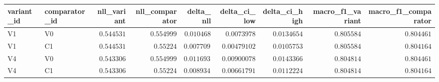 \begin{tabular}{llrrrrrrr}
\toprule
variant\_id & comparator\_id & nll\_variant & nll\_comparator & delta\_nll & delta\_ci\_low & delta\_ci\_high & macro\_f1\_variant & macro\_f1\_comparator \\
\midrule
V1 & V0 & $0.544531$ & $0.554999$ & $0.010468$ & $0.0073978$ & $0.0134654$ & $0.805584$ & $0.804461$ \\
V1 & C1 & $0.544531$ & $0.55224$ & $0.00770904$ & $0.00479102$ & $0.0105753$ & $0.805584$ & $0.804164$ \\
V4 & V0 & $0.543306$ & $0.554999$ & $0.0116932$ & $0.00900078$ & $0.0143366$ & $0.804814$ & $0.804461$ \\
V4 & C1 & $0.543306$ & $0.55224$ & $0.00893424$ & $0.00661791$ & $0.0112224$ & $0.804814$ & $0.804164$ \\
\bottomrule
\end{tabular}
